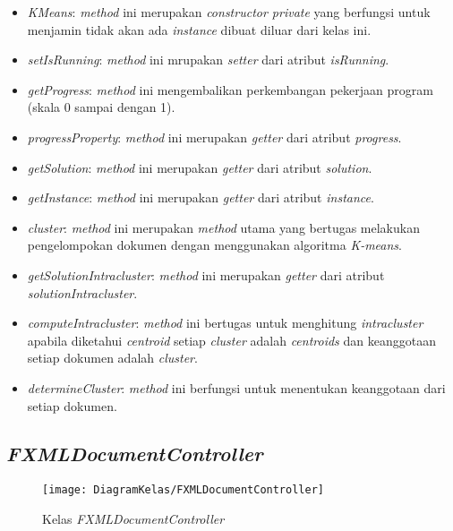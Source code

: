 \begin{itemize}
	\item \textit{KMeans}: \textit{method} ini merupakan \textit{constructor private} yang berfungsi untuk menjamin tidak akan ada \textit{instance} dibuat diluar dari kelas ini.
	\item \textit{setIsRunning}: \textit{method} ini mrupakan \textit{setter} dari atribut \textit{isRunning}.
	\item \textit{getProgress}: \textit{method} ini mengembalikan perkembangan pekerjaan program (skala 0 sampai dengan 1).
	\item \textit{progressProperty}: \textit{method} ini merupakan \textit{getter} dari atribut \textit{progress}.
	\item \textit{getSolution}: \textit{method} ini merupakan \textit{getter} dari atribut \textit{solution}.
	\item \textit{getInstance}: \textit{method} ini merupakan \textit{getter} dari atribut \textit{instance}.
	\item \textit{cluster}: \textit{method} ini merupakan \textit{method} utama yang bertugas melakukan pengelompokan dokumen dengan menggunakan algoritma \textit{K-means}.
	\item \textit{getSolutionIntracluster}: \textit{method} ini merupakan \textit{getter} dari atribut \textit{solutionIntracluster}.
	\item \textit{computeIntracluster}: \textit{method} ini bertugas untuk menghitung \textit{intracluster} apabila diketahui \textit{centroid} setiap \textit{cluster} adalah \textit{centroids} dan keanggotaan setiap dokumen adalah \textit{cluster}.
	\item \textit{determineCluster}: \textit{method} ini berfungsi untuk menentukan keanggotaan dari setiap dokumen.
\end{itemize}

\subsection{\textit{FXMLDocumentController}}

\begin{figure}[H]
	\begin{center}
		\texttt{[image: DiagramKelas/FXMLDocumentController]}
		\caption{Kelas \textit{FXMLDocumentController}}
		\label{fig:kelasFXMLDocumentController}
	\end{center}
\end{figure}

